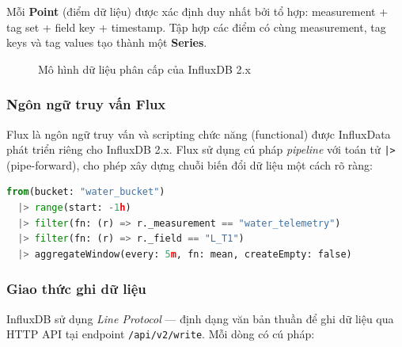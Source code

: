 Mỗi \textbf{Point} (điểm dữ liệu) được xác định duy nhất bởi tổ hợp:
measurement + tag set + field key + timestamp. Tập hợp các điểm có cùng
measurement, tag keys và tag values tạo thành một \textbf{Series}.

\begin{figure}[H]
  \centering
  \setlength{\fboxsep}{12pt}
  \caption{Mô hình dữ liệu phân cấp của InfluxDB 2.x}
  \label{fig:influxdb-model}
\end{figure}

\subsubsection{Ngôn ngữ truy vấn Flux}

Flux là ngôn ngữ truy vấn và scripting chức năng (functional) được InfluxData phát
triển riêng cho InfluxDB 2.x. Flux sử dụng cú pháp \emph{pipeline} với toán tử
\texttt{|>} (pipe-forward), cho phép xây dựng chuỗi biến đổi dữ liệu một cách rõ
ràng:

\begin{lstlisting}[language=Python, caption={Ví dụ truy vấn Flux lấy dữ liệu mức nước trong 1 giờ qua}]
from(bucket: "water_bucket")
  |> range(start: -1h)
  |> filter(fn: (r) => r._measurement == "water_telemetry")
  |> filter(fn: (r) => r._field == "L_T1")
  |> aggregateWindow(every: 5m, fn: mean, createEmpty: false)
\end{lstlisting}

\subsubsection{Giao thức ghi dữ liệu}

InfluxDB sử dụng \emph{Line Protocol} --- định dạng văn bản thuần để ghi dữ liệu
qua HTTP API tại endpoint \texttt{/api/v2/write}. Mỗi dòng có cú pháp:

